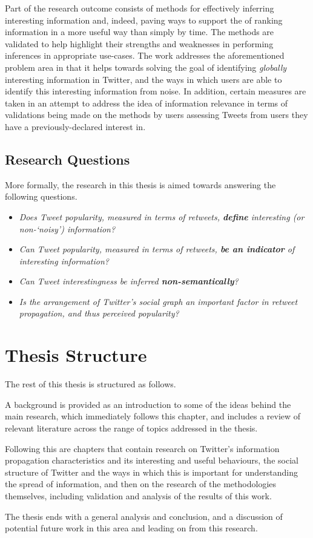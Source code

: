 Part of the research outcome consists of methods for effectively inferring interesting information and, indeed, paving ways to support the of ranking information in a more useful way than simply by time. The methods are validated to help highlight their strengths and weaknesses in performing inferences in appropriate use-cases. The work addresses the aforementioned problem area in that it helps towards solving the goal of identifying \textit{globally} interesting information in Twitter, and the ways in which users are able to identify this interesting information from noise. In addition, certain measures are taken in an attempt to address the idea of information relevance in terms of validations being made on the methods by users assessing Tweets from users they have a previously-declared interest in.


\subsection{Research Questions}
More formally, the research in this thesis is aimed towards answering the following questions.
\begin{itemize}
    \item \textit{Does Tweet popularity, measured in terms of retweets, \textbf{define} interesting (or non-`noisy') information?}
    \item \textit{Can Tweet popularity, measured in terms of retweets, \textbf{be an indicator} of interesting information?}
    \item \textit{Can Tweet interestingness be inferred \textbf{non-semantically}?}
    \item \textit{Is the arrangement of Twitter's social graph an important factor in retweet propagation, and thus perceived popularity?}
\end{itemize} 



\section{Thesis Structure}
The rest of this thesis is structured as follows.

A background is provided as an introduction to some of the ideas behind the main research, which immediately follows this chapter, and includes a review of relevant literature across the range of topics addressed in the thesis.

Following this are chapters that contain research on Twitter's information propagation characteristics and its interesting and useful behaviours, the social structure of Twitter and the ways in which this is important for understanding the spread of information, and then on the research of the methodologies themselves, including validation and analysis of the results of this work.

The thesis ends with a general analysis and conclusion, and a discussion of potential future work in this area and leading on from this research.
